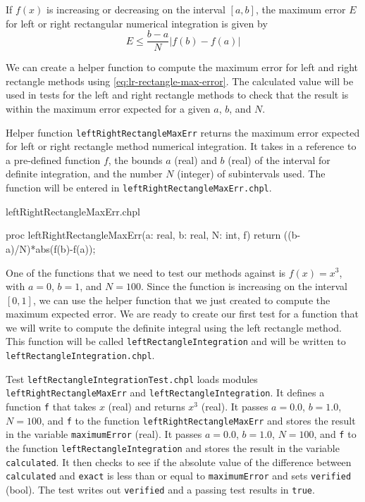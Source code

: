 If $f(x)$ is increasing or decreasing on the interval $[a,b]$, the maximum error $E$ 
for left or right rectangular numerical integration is given by
\begin{equation}
E \leq \frac{b-a}{N}\left|f(b)-f(a)\right| \label{eq:lr-rectangle-max-error}
\end{equation}

We can create a helper function to compute the maximum error for left and right rectangle
methods using \ref{eq:lr-rectangle-max-error}. The calculated value will be used
in tests for the left and right rectangle methods to check that the result is within 
the maximum error expected for a given $a$, $b$, and $N$. 
\begin{enumspec}
\item{} Helper function \lstinline{leftRightRectangleMaxErr} returns the
maximum error expected for left or right rectangle method numerical integration. It 
takes in a reference to a pre-defined function $f$, the bounds $a$ (real) and $b$ (real) of the 
interval for definite integration, and the number $N$ (integer) of subintervals used.
The function will be entered in \lstinline{leftRightRectangleMaxErr.chpl}.
\end{enumspec}

\begin{chapelhelper}{leftRightRectangleMaxErr.chpl}
\begin{chapel}
proc leftRightRectangleMaxErr(a: real, b: real, N: int, f){
  return ((b-a)/N)*abs(f(b)-f(a));
}
\end{chapel}
\end{chapelhelper}

One of the functions that we need to test our methods against is $f(x) = x^3$, 
with $a=0$, $b=1$, and $N=100$.
Since the function is increasing on the interval $[0,1]$, we can use 
the helper function that we just created to compute the maximum expected error. We are
ready to create our first test for a function that we will write to compute the definite
integral using the left rectangle method. This function will be called \lstinline{leftRectangleIntegration}
and will be written to \lstinline{leftRectangleIntegration.chpl}.
\begin{enumspec}
\item{}
Test \lstinline{leftRectangleIntegrationTest.chpl} loads modules
\lstinline{leftRightRectangleMaxErr} and
\lstinline{leftRectangleIntegration}.
It defines a function \lstinline{f} that takes $x$ (real) and returns $x^3$ (real).
It passes $a=0.0$, $b=1.0$, $N=100$, and \lstinline{f} to the function
\lstinline{leftRightRectangleMaxErr} and stores the result in the variable
\lstinline{maximumError} (real).
It passes $a=0.0$, $b=1.0$, $N=100$, and \lstinline{f} to the function
\lstinline{leftRectangleIntegration} and stores the result in the variable
\lstinline{calculated}.
It then checks to see if the absolute value of the difference between \lstinline{calculated} 
and \lstinline{exact} is less than or equal to \lstinline{maximumError} and sets 
\lstinline{verified} (bool). The test writes out \lstinline{verified} and a passing
test results in \lstinline{true}.
\end{enumspec}

